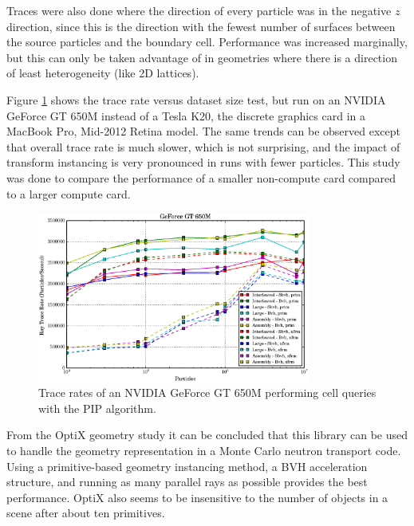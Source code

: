 Traces were also done where the direction of every particle was in the negative $z$ direction, since this is the direction with the fewest number of surfaces between the source particles and the boundary cell.  Performance was increased marginally, but this can only be taken advantage of in geometries where there is a direction of least heterogeneity (like 2D lattices).%

Figure \ref{prelim_optix_G650M} shows the trace rate versus dataset size test, but run on an NVIDIA GeForce GT 650M instead of a Tesla K20, the discrete graphics card in a MacBook Pro, Mid-2012 Retina model.  The same trends can be observed except that overall trace rate is much slower, which is not surprising,%
 and the impact of transform instancing is very pronounced in runs with fewer particles.  This study was done to compare the performance of a smaller non-compute card compared to a larger compute card.

\begin{figure}[h!] 
  \centering
    \includegraphics[width=0.8\textwidth]{graphics/prelim_optix_G650M.eps}
     \caption{Trace rates of an NVIDIA GeForce GT 650M performing cell queries with the PIP algorithm. \label{prelim_optix_G650M} }
\end{figure}%

From the OptiX geometry study it can be concluded that this library can be used to handle the geometry representation in a Monte Carlo neutron transport code.  Using a primitive-based geometry instancing method, a BVH acceleration structure, and running as many parallel rays as possible provides the best performance.  OptiX also seems to be insensitive to the number of objects in a scene after about ten primitives.

